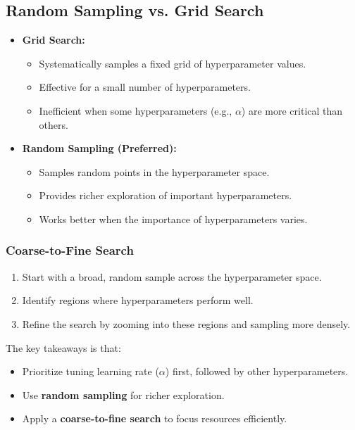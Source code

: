 \documentclass[letterpaper,12pt,notitlepage,twoside]{report}
\begin{document}
\subsection*{Random Sampling vs. Grid Search}
\begin{itemize}[nosep]
    \item \textbf{Grid Search:}
    \begin{itemize}
        \item Systematically samples a fixed grid of hyperparameter values.
        \item Effective for a small number of hyperparameters.
        \item Inefficient when some hyperparameters (e.g., $\alpha$) are more critical than others.
    \end{itemize}
    \item \textbf{Random Sampling (Preferred):}
    \begin{itemize}
        \item Samples random points in the hyperparameter space.
        \item Provides richer exploration of important hyperparameters.
        \item Works better when the importance of hyperparameters varies.
    \end{itemize}
\end{itemize}

\subsubsection*{Coarse-to-Fine Search}
\begin{enumerate}[noitemsep, topsep=0pt]
    \item Start with a broad, random sample across the hyperparameter space.
    \item Identify regions where hyperparameters perform well.
    \item Refine the search by zooming into these regions and sampling more densely.
\end{enumerate}

The key takeaways is that:
\begin{itemize}[noitemsep, topsep=0pt]
    \item Prioritize tuning learning rate ($\alpha$) first, followed by other hyperparameters.
    \item Use \textbf{random sampling} for richer exploration.
    \item Apply a \textbf{coarse-to-fine search} to focus resources efficiently.
\end{itemize}
\end{document}
